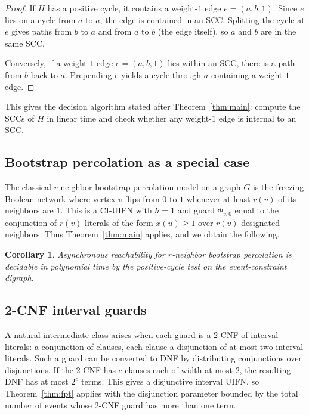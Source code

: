 \documentclass[final,3p,times]{elsarticle}
\newtheorem{corollary}[theorem]{Corollary}
\theoremstyle{definition}
\theoremstyle{remark}
\begin{document}
\begin{proof}
If $H$ has a positive cycle, it contains a weight-$1$ edge $e=(a,b,1)$.
Since $e$ lies on a cycle from $a$ to $a$, the edge is contained in an SCC.
Splitting the cycle at $e$ gives paths from $b$ to $a$ and from $a$ to $b$ (the edge itself), so $a$ and $b$ are in the same SCC.

Conversely, if a weight-$1$ edge $e=(a,b,1)$ lies within an SCC, there is a path from $b$ back to $a$.
Prepending $e$ yields a cycle through $a$ containing a weight-$1$ edge.
\end{proof}

This gives the decision algorithm stated after Theorem~\ref{thm:main}: compute the SCCs of $H$ in linear time and check whether any weight-$1$ edge is internal to an SCC.

\subsection*{Bootstrap percolation as a special case}

The classical $r$-neighbor bootstrap percolation model on a graph $G$ is the freezing Boolean network where vertex $v$ flips from $0$ to $1$ whenever at least $r(v)$ of its neighbors are $1$.
This is a CI-UIFN with $h=1$ and guard $\Phi_{v,0}$ equal to the conjunction of $r(v)$ literals of the form $x(u)\ge 1$ over $r(v)$ designated neighbors.
Thus Theorem~\ref{thm:main} applies, and we obtain the following.

\begin{corollary}\label{cor:bootstrap}
Asynchronous reachability for $r$-neighbor bootstrap percolation is decidable in polynomial time by the positive-cycle test on the event-constraint digraph.
\end{corollary}

\subsection*{2-CNF interval guards}

A natural intermediate class arises when each guard is a 2-CNF of interval literals: a conjunction of clauses, each clause a disjunction of at most two interval literals.
Such a guard can be converted to DNF by distributing conjunctions over disjunctions.
If the 2-CNF has $c$ clauses each of width at most $2$, the resulting DNF has at most $2^c$ terms.
This gives a disjunctive interval UIFN, so Theorem~\ref{thm:fpt} applies with the disjunction parameter bounded by the total number of events whose 2-CNF guard has more than one term.
\end{document}
